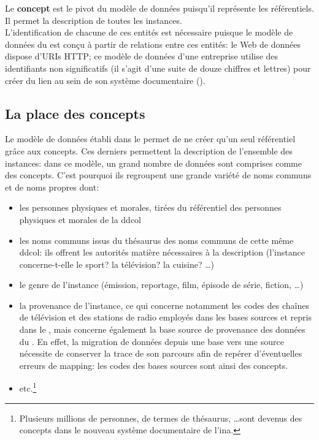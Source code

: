 \noindent Le \textbf{concept} est le pivot du modèle de données puisqu'il représente les référentiels. Il permet la description de toutes les instances.\\

L'identification de chacune de ces entités est nécessaire puisque le modèle de données du \ldd est conçu à partir de relations entre ces entités: le Web de données dispose d'URIs HTTP; ce modèle de données d'une entreprise utilise des identifiants non significatifs (il s'agit d'une suite de douze chiffres et lettres) pour créer du lien au sein de son système documentaire ().



\subsection{\label{III-B-2-b}La place des concepts}

Le modèle de données établi dans le \ldd permet de ne créer qu'un seul \og référentiel\fg{} grâce aux concepts. Ces derniers permettent la description de l'ensemble des instances: dans ce modèle, un grand nombre de données sont comprises comme des concepts. C'est pourquoi ils regroupent une grande variété de noms communs et de noms propres dont:
\begin{itemize}
	\item les personnes physiques et morales, tirées du référentiel des personnes physiques et morales de la \ac{ddcol}
	\item les noms communs issus du thésaurus des noms communs de cette même \ac{ddcol}: ils offrent les autorités matière nécessaires à la description (l'instance concerne-t-elle le sport? la télévision? la cuisine? \dots)
	\item  le genre de l'instance (émission, reportage, film, épisode de série, fiction, \dots)
	\item la provenance de l'instance, ce qui concerne notamment les codes des chaînes de télévision et des stations de radio employés dans les bases sources et repris dans le \ldd, mais concerne également la base source de provenance des données du \ldd. En effet, la migration de données depuis une base vers une source nécessite de conserver la trace de son parcours afin de repérer d'éventuelles erreurs de mapping: les codes des bases sources sont ainsi des concepts.
	\item etc.\footnote{Plusieurs millions de personnes, de termes de thésaurus, \dots sont devenus des concepts dans le nouveau système documentaire de l'\ac{ina}.}
\end{itemize}
\medskip


